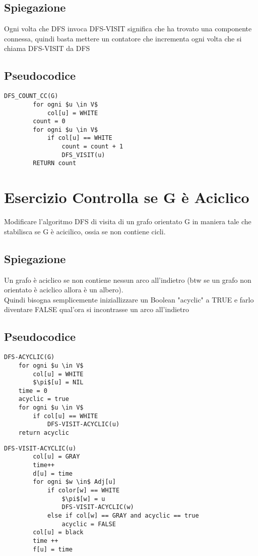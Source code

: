 \documentclass[12pt, a4paper, openany]{book}
\begin{document}
	\subsection*{Spiegazione}
	Ogni volta che DFS invoca DFS-VISIT significa che ha trovato una componente connessa, quindi basta mettere un contatore che incrementa ogni volta che si chiama DFS-VISIT da DFS
	\subsection*{Pseudocodice}
	\begin{lstlisting}[mathescape=true]
    DFS_COUNT_CC(G)
        for ogni $u \in V$
            col[u] = WHITE
        count = 0
        for ogni $u \in V$
            if col[u] == WHITE
                count = count + 1
                DFS_VISIT(u)
        RETURN count
\end{lstlisting}

	\section{Esercizio Controlla se G è Aciclico}
	Modificare l’algoritmo DFS di visita di un grafo orientato G in maniera tale che stabilisca
	se G è acicilico, ossia se non contiene cicli.
	\subsection*{Spiegazione}
	Un grafo è aciclico se non contiene nessun arco all'indietro (btw se un grafo non orientato è aciclico allora è un albero).
	\\Quindi bisogna semplicemente iniziallizzare un Boolean "acyclic" a TRUE e farlo diventare FALSE qual'ora si incontrasse un arco all'indietro

	\subsection*{Pseudocodice}
	\begin{lstlisting}[mathescape=true]
DFS-ACYCLIC(G)
    for ogni $u \in V$
        col[u] = WHITE
        $\pi$[u] = NIL
    time = 0
    acyclic = true
    for ogni $u \in V$
        if col[u] == WHITE
            DFS-VISIT-ACYCLIC(u)
    return acyclic    
\end{lstlisting}

	\begin{lstlisting}[mathescape=true]
    DFS-VISIT-ACYCLIC(u)
        col[u] = GRAY
        time++
        d[u] = time
        for ogni $w \in$ Adj[u]
            if color[w] == WHITE
                $\pi$[w] = u
                DFS-VISIT-ACYCLIC(w)
            else if col[w] == GRAY and acyclic == true
                acyclic = FALSE
        col[u] = black
        time ++
        f[u] = time
    \end{lstlisting}
\end{document}
